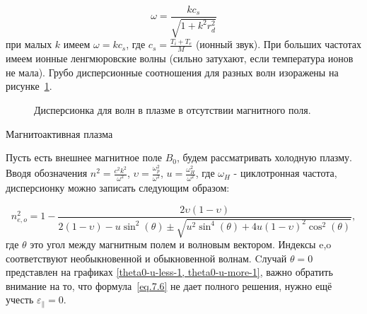 \documentclass[10pt, a4paper]{article}
\begin{document}
\begin{equation}
    \label{eq.7.5}
    \omega=\frac{k c_s}{\sqrt{1 + k^2 r_d^2}}
\end{equation}
при малых $k$ имеем $\omega=k c_s$, где $c_s=\frac{T_i + T_e}{M}$ (ионный звук). При больших частотах имеем ионные ленгмюровские волны (сильно затухают, если температура ионов не мала). Грубо дисперсионные соотношения для разных волн изоражены на рисунке~\ref{plot.7.1}.

\begin{figure}[h!]
    \caption{\label{plot.7.1} Дисперсионка для волн в плазме в отсутствии магнитного поля.}
\end{figure}

Магнитоактивная плазма

Пусть есть внешнее магнитное поле $B_0$, будем рассматривать холодную плазму. Вводя обозначения $n^2=\frac{c^2 k^2}{\omega^2}$, $\upsilon=\frac{\omega_p^2}{\omega^2}$, $u=\frac{\omega_H^2}{\omega^2}$, где $\omega_H$ - циклотронная частота,
дисперсионку можно записать следующим образом:

\begin{equation}
    \label{eq.7.6}
    n_{e,o}^2=1-\frac{2\upsilon (1-\upsilon)}{2(1-\upsilon) - u \sin^2(\theta) \pm \sqrt{u^2 \sin^4(\theta) + 4u(1-\upsilon)^2 \cos^2(\theta)}}, 
\end{equation}
где $\theta$ это угол между магнитным полем и волновым вектором. Индексы e,o соответствуют необыкновенной и обыкновенной волнам.
Cлучай $\theta=0$ представлен на графиках \ref{theta0-u-less-1, theta0-u-more-1}, важно обратить внимание на то, что формула~\ref{eq.7.6} не дает полного решения, нужно ещё учесть $\varepsilon_{\parallel}=0$.
\end{document}

